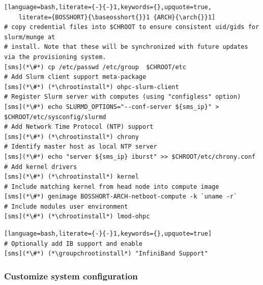 \documentclass[letterpaper]{article}
\newcommand{\baseosshort}{rocky10}
\newcommand{\arch}{x86\_64}
\newcommand{\chrootinstall}{dnf -y --installroot=\$CHROOT install}
\newcommand{\groupchrootinstall}{dnf -y --installroot=\$CHROOT groupinstall}
\begin{document}
\begin{lstlisting}[language=bash,literate={-}{-}1,keywords={},upquote=true,
    literate={BOSSHORT}{\baseosshort{}}1 {ARCH}{\arch{}}1]
# copy credential files into $CHROOT to ensure consistent uid/gids for slurm/munge at
# install. Note that these will be synchronized with future updates via the provisioning system.
[sms](*\#*) cp /etc/passwd /etc/group  $CHROOT/etc
# Add Slurm client support meta-package
[sms](*\#*) (*\chrootinstall*) ohpc-slurm-client
# Register Slurm server with computes (using "configless" option)
[sms](*\#*) echo SLURMD_OPTIONS="--conf-server ${sms_ip}" > $CHROOT/etc/sysconfig/slurmd
# Add Network Time Protocol (NTP) support
[sms](*\#*) (*\chrootinstall*) chrony
# Identify master host as local NTP server
[sms](*\#*) echo "server ${sms_ip} iburst" >> $CHROOT/etc/chrony.conf
# Add kernel drivers
[sms](*\#*) (*\chrootinstall*) kernel
# Include matching kernel from head node into compute image
[sms](*\#*) genimage BOSSHORT-ARCH-netboot-compute -k `uname -r`
# Include modules user environment
[sms](*\#*) (*\chrootinstall*) lmod-ohpc
\end{lstlisting}

\begin{lstlisting}[language=bash,literate={-}{-}1,keywords={},upquote=true]
# Optionally add IB support and enable
[sms](*\#*) (*\groupchrootinstall*) "InfiniBand Support"
\end{lstlisting}

\subsubsection{Customize system configuration} \label{sec:master_customization}




\end{document}
